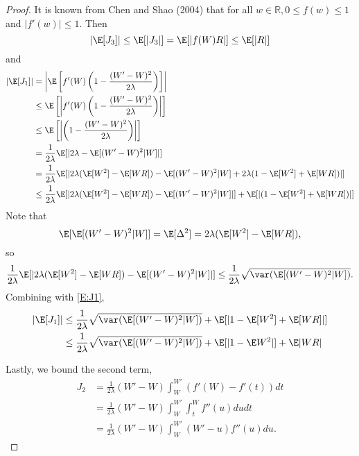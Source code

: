 \begin{proof}
  It is known from Chen and Shao (2004) that for all $w \in \mathbb{R}, 0 \leq f(w) \leq 1$ and
  $|f'(w)| \leq 1$.  Then
  \begin{equation}
    |\E [J_3]| \leq \E [|J_3|] = \E [|f(W)R|] \leq \E [|R|]
  \end{equation}
  and
  \begin{equation}
    \label{E:J1}
    \begin{split}
      |\E [J_1] | &= \left | \E \left [f'(W)\left (1-\frac{(W'-W)^2}{2\lambda} \right ) \right ]
      \right | \\
      &\leq \E \left [\left | f'(W)\left (1-\frac{(W'-W)^2}{2\lambda} \right ) \right | \right ] \\
      &\leq \E \left [ \left | \left (1-\frac{(W'-W)^2}{2\lambda} \right )  \right | \right ] \\
      &= \frac{1}{2\lambda} \E [|2\lambda - \E [(W'-W)^2|W]|] \\
      &= \frac{1}{2\lambda} \E [|2\lambda (\E [W^2] - \E [WR]) - \E [(W'-W)^2|W] + 
      2\lambda (1 - \E [W^2] + \E [WR])|] \\
      &\leq \frac{1}{2\lambda} \E [|2\lambda (\E [W^2] - \E [WR]) - \E [(W'-W)^2|W]|] + 
      \E [|(1 - \E [W^2] + \E [WR])|]
    \end{split}
  \end{equation}
  Note that 
  \begin{equation}
    \E [\E [(W'-W)^2|W]] = \E [\Delta^2] = 2 \lambda (\E [W^2] - \E [WR]),
  \end{equation}
  so
  \begin{equation}
    \frac{1}{2\lambda} \E [|2\lambda (\E [W^2] - \E [WR]) - \E [(W'-W)^2|W]|] \leq
    \frac{1}{2\lambda} \sqrt{\var (\E [(W'-W)^2|W])}.
  \end{equation}
  Combining with \eqref{E:J1},
  \begin{equation}
    \begin{split}
      |\E [J_1] | &\leq \frac{1}{2\lambda} \sqrt{\var (\E [(W'-W)^2|W])} +
      \E [|1 - \E [W^2] + \E [WR]|] \\
      &\leq \frac{1}{2\lambda} \sqrt{\var (\E [(W'-W)^2|W])} + \E [|1 - \E W^2|] + \E |WR| \\
    \end{split}
  \end{equation}
  
  Lastly, we bound the second term, 
  \begin{equation}
    \begin{split}
      J_2 &= \frac{1}{2 \lambda}(W'-W)\int_W^{W'} (f'(W)-f'(t)) dt \\
      &= \frac{1}{2 \lambda}(W'-W)\int_W^{W'}\int_t^Wf''(u) du dt \\
      &= \frac{1}{2 \lambda}(W'-W)\int_W^{W'} (W'-u)f''(u) du.
    \end{split}
  \end{equation}


\end{proof}
